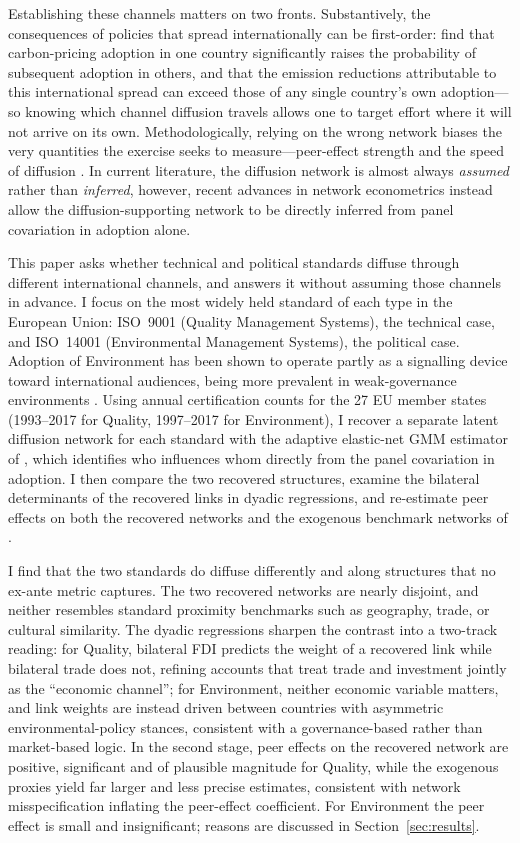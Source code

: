 \documentclass[12pt,a4paper]{article}
\begin{document}
Establishing these channels matters on two fronts. Substantively, the consequences of
policies that spread internationally can be first-order: \citet{linsenmeier2023} find that
carbon-pricing adoption in one country significantly raises the probability of subsequent
adoption in others, and that the emission reductions attributable to this international
spread can exceed those of any single country's own adoption---so knowing which channel
diffusion travels allows one to target effort where it will not arrive on its own.
Methodologically, relying on the wrong network biases the very quantities the exercise
seeks to measure---peer-effect strength and the speed of diffusion \citep{depaula2025,
    bramoulle2009}. In current literature, the diffusion network is almost always \emph{assumed} rather than
\emph{inferred}, however, recent advances in
network econometrics instead allow the diffusion-supporting network to be directly inferred from
panel covariation in adoption alone.

This paper asks whether technical and political standards diffuse through different
international channels, and answers it without assuming those channels in advance. I
focus on the most widely held standard of each type in the European Union: ISO~9001
(Quality Management Systems), the technical case, and ISO~14001 (Environmental Management Systems), the
political case. Adoption of Environment has been shown to operate partly as a
signalling device toward international audiences, being more prevalent in weak-governance
environments \citep{berliner2013}. Using annual certification counts for the 27 EU member
states (1993--2017 for Quality, 1997--2017 for Environment), I recover a separate latent
diffusion network for each standard with the adaptive elastic-net GMM estimator of
\citet{depaula2025}, which identifies who influences whom directly from the panel
covariation in adoption. I then compare
the two recovered structures, examine the bilateral determinants of the recovered links in
dyadic regressions, and re-estimate peer effects \citep{bramoulle2009} on both the
recovered networks and the exogenous benchmark networks of \citet{albuquerque2007}.

I find that the two standards do diffuse differently and along structures that no ex-ante
metric captures. The two recovered networks are nearly disjoint, and neither resembles standard proximity benchmarks such as geography, trade, or cultural similarity. The dyadic regressions sharpen the contrast into a two-track reading: for
Quality, bilateral FDI predicts the weight of a recovered link while bilateral trade does
not, refining accounts that treat trade and investment jointly as the ``economic channel'';
for Environment, neither economic variable matters, and link weights are instead driven
between countries with asymmetric environmental-policy stances, consistent with a
governance-based rather than market-based logic. In the second stage, peer effects on the
recovered network are positive, significant and of plausible magnitude for Quality, while the exogenous proxies yield far larger and less precise
estimates, consistent with network misspecification inflating the peer-effect coefficient.
For Environment the peer effect is small and insignificant; reasons are discussed in
Section~\ref{sec:results}.
\end{document}

